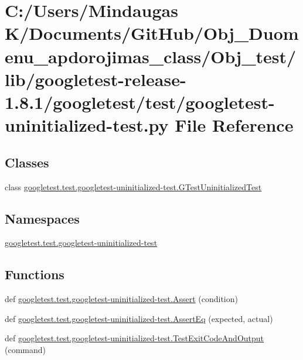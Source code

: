 \hypertarget{_obj__test_2lib_2googletest-release-1_88_81_2googletest_2test_2googletest-uninitialized-test_8py}{}\section{C\+:/\+Users/\+Mindaugas K/\+Documents/\+Git\+Hub/\+Obj\+\_\+\+Duomenu\+\_\+apdorojimas\+\_\+class/\+Obj\+\_\+test/lib/googletest-\/release-\/1.8.1/googletest/test/googletest-\/uninitialized-\/test.py File Reference}
\label{_obj__test_2lib_2googletest-release-1_88_81_2googletest_2test_2googletest-uninitialized-test_8py}
\subsection*{Classes}
\begin{DoxyCompactItemize}
\item 
class \mbox{\hyperlink{classgoogletest_1_1test_1_1googletest-uninitialized-test_1_1_g_test_uninitialized_test}{googletest.\+test.\+googletest-\/uninitialized-\/test.\+G\+Test\+Uninitialized\+Test}}
\end{DoxyCompactItemize}
\subsection*{Namespaces}
\begin{DoxyCompactItemize}
\item 
 \mbox{\hyperlink{namespacegoogletest_1_1test_1_1googletest-uninitialized-test}{googletest.\+test.\+googletest-\/uninitialized-\/test}}
\end{DoxyCompactItemize}
\subsection*{Functions}
\begin{DoxyCompactItemize}
\item 
def \mbox{\hyperlink{namespacegoogletest_1_1test_1_1googletest-uninitialized-test_a5f06058f728a559b18b86d60e08f2a9f}{googletest.\+test.\+googletest-\/uninitialized-\/test.\+Assert}} (condition)
\item 
def \mbox{\hyperlink{namespacegoogletest_1_1test_1_1googletest-uninitialized-test_af543f1fa1e8d61d8c33e0d3127d93303}{googletest.\+test.\+googletest-\/uninitialized-\/test.\+Assert\+Eq}} (expected, actual)
\item 
def \mbox{\hyperlink{namespacegoogletest_1_1test_1_1googletest-uninitialized-test_a7949e509b630fdabf66243aade024a35}{googletest.\+test.\+googletest-\/uninitialized-\/test.\+Test\+Exit\+Code\+And\+Output}} (command)
\end{DoxyCompactItemize}
